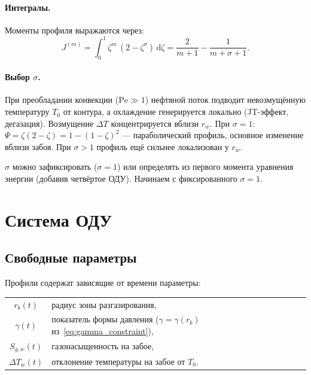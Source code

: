 \documentclass[12pt,a4paper]{article}
\newcommand{\dd}{\mathrm{d}}
\begin{document}
\paragraph{Интегралы.}
Моменты профиля выражаются через:
\begin{equation}\label{eq:IPsi}
  J^{(m)} = \int_0^1 \zeta^m\,(2 - \zeta^\sigma)\,\dd\zeta
  = \frac{2}{m+1} - \frac{1}{m+\sigma+1}.
\end{equation}

\paragraph{Выбор $\sigma$.}
При преобладании конвекции ($\mathrm{Pe} \gg 1$)
нефтяной поток подводит невозмущённую
температуру $T_0$ от контура, а охлаждение
генерируется локально (JT-эффект, дегазация).
Возмущение $\Delta T$ концентрируется
вблизи $r_w$. При $\sigma = 1$: $\Psi = \zeta(2-\zeta) = 1-(1-\zeta)^2$ ---
параболический профиль, основное изменение
вблизи забоя. При $\sigma > 1$ профиль
ещё сильнее локализован у $r_w$.

$\sigma$ можно зафиксировать ($\sigma = 1$) или определять
из первого момента уравнения энергии (добавив четвёртое ОДУ).
Начинаем с фиксированного $\sigma = 1$.


\section{Система ОДУ}\label{sec:ode}

\subsection{Свободные параметры}

Профили содержат зависящие от времени параметры:
\begin{center}
\begin{tabular}{cl}
  $r_b(t)$       & радиус зоны разгазирования, \\
  $\gamma(t)$    & показатель формы давления
                    ($\gamma = \gamma(r_b)$
                    из~\eqref{eq:gamma_constraint}), \\
  $S_{g,w}(t)$   & газонасыщенность на забое, \\
  $\Delta T_w(t)$ & отклонение температуры на забое от $T_0$.
\end{tabular}
\end{center}
\end{document}
